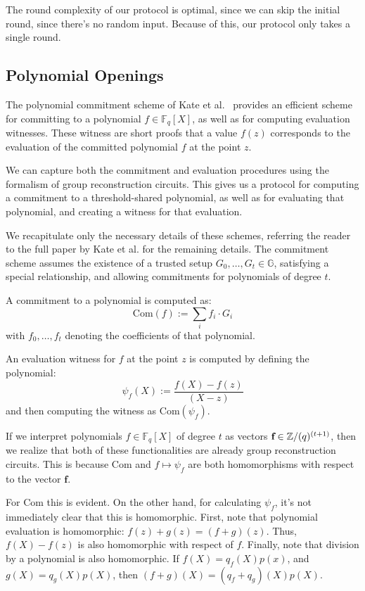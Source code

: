 The round complexity of our protocol is optimal, since we can skip
the initial round, since there's no random input.
Because of this, our protocol only takes a single round.

\subsection{Polynomial Openings}

The polynomial commitment scheme of Kate et al.~\cite{kate_constant-size_2010}
provides an efficient scheme for committing to a polynomial
$f \in \mathbb{F}_q[X]$, as well as for computing evaluation witnesses.
These witness are short proofs that a value $f(z)$ corresponds
to the evaluation of the committed polynomial $f$ at the point $z$.

We can capture both the commitment and evaluation procedures
using the formalism of group reconstruction circuits.
This gives us a protocol for computing a commitment to a
threshold-shared polynomial, as well as for evaluating that polynomial,
and creating a witness for that evaluation.

We recapitulate only the necessary details of these schemes,
referring the reader to the full paper by Kate et al. for the remaining
details.
The commitment scheme assumes the existence of a trusted
setup $G_0, \ldots, G_t \in \mathbb{G}$, satisfying a special relationship,
and allowing commitments for polynomials of degree $t$.

A commitment to a polynomial is computed as:
$$
\text{Com}(f) := \sum_i f_i \cdot G_i
$$
with $f_0, \ldots, f_t$ denoting the coefficients of that polynomial.

An evaluation witness for $f$ at the point $z$ is computed by defining
the polynomial:
$$
\psi_f(X) := \frac{f(X) - f(z)}{(X - z)}
$$
and then computing the witness as $\text{Com}(\psi_f)$.

If we interpret polynomials $f \in \mathbb{F}_q[X]$ of degree $t$
as vectors $\textbf{f} \in \mathbb{Z}/(q)^{(t + 1)}$, 
then we realize that both of these functionalities are already
group reconstruction circuits.
This is because $\text{Com}$ and $f \mapsto \psi_f$ are both
homomorphisms with respect to the vector $\textbf{f}$.

For $\text{Com}$ this is evident.
On the other hand, for calculating $\psi_f$, it's not immediately
clear that this is homomorphic.
First, note that polynomial evaluation is homomorphic:
$f(z) + g(z) = (f + g)(z)$.
Thus, $f(X) - f(z)$ is also homomorphic with respect of $f$.
Finally, note that division by a polynomial is also homomorphic.
If $f(X) = q_f(X) p(x)$, and $g(X) = q_g(X) p(X)$, then $(f + g)(X) = (q_f + q_g)(X) p(X)$.

